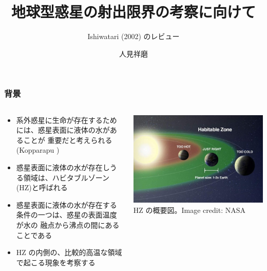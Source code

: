 \documentclass[aspectratio=149,9pt,fleqn]{beamer}
\institute{北海道大学大学院理学院 地球流体力学研究室 M2}
\author{人見祥磨}
\title{地球型惑星の射出限界の考察に向けて}
\subtitle{Ishiwatari \etal (2002) のレビュー}
\begin{document}
\maketitle

\begin{frame}
	\frametitle{背景}
	\begin{columns}[T,onlytextwidth]
		\begin{column}{.6\textwidth}
			\begin{itemize}
				\item 系外惑星に生命が存在するためには、惑星表面に液体の水があることが
					重要だと考えられる (Kopparapu )
				\item 惑星表面に液体の水が存在しうる領域は、ハビタブルゾーン (HZ)と呼ばれる
				\item 惑星表面に液体の水が存在する条件の一つは、惑星の表面温度が水の
					融点から沸点の間にあることである
				\item HZ の内側の、比較的高温な領域で起こる現象を考察する
			\end{itemize}
		\end{column}
		\begin{column}{.35\textwidth}
			\centering
			\includegraphics[width=\textwidth]{hz.jpg}\\
			\scriptsize HZ の概要図。Image credit: NASA
		\end{column}
	\end{columns}
\end{frame}
\end{document}
